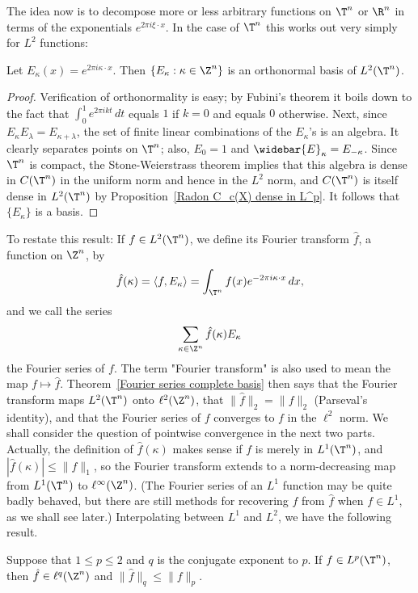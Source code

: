 The idea now is to decompose more or less arbitrary functions on $\T^n$ or $\R^n$ in terms of the exponentials $e^{2\pi i\xi\cdot x}$. In the case of $\T^n$ this works out very simply for $L^2$ functions:
\begin{theorem}\label{Fourier series complete basis}
Let $E_\kappa(x)=e^{2\pi i\kappa\cdot x}$. Then $\{E_\kappa:\kappa\in\Z^n\}$ is an orthonormal basis of $L^2(\T^n)$.
\end{theorem}
\begin{proof}
Verification of orthonormality is easy; by Fubini's theorem it boils down to the fact that $\int_{0}^{1}e^{2\pi ikt}\,dt$ equals $1$ if $k=0$ and equals $0$ otherwise. Next, since $E_{\kappa}E_{\lambda}=E_{\kappa+\lambda}$, the set of finite linear combinations of the $E_{\kappa}$'s is an algebra. It clearly separates points on $\T^n$; also, $E_0=1$ and $\widebar{E}_{\kappa}=E_{-\kappa}$. Since $\T^n$ is compact, the Stone-Weierstrass theorem implies that this algebra is dense in $C(\T^n)$ in the uniform norm and hence in the $L^2$ norm, and $C(\T^n)$ is itself dense in $L^2(\T^n)$ by Proposition~\ref{Radon C_c(X) dense in L^p}. It follows that $\{E_\kappa\}$ is a basis.
\end{proof}
To restate this result: If $f\in L^2(\T^n)$, we define its Fourier transform $\hat{f}$, a function on $\Z^n$, by
\[\hat{f}(\kappa)=\langle f,E_\kappa\rangle=\int_{\T^n}f(x)e^{-2\pi i\kappa\cdot x}\,dx,\]
and we call the series
\[\sum_{\kappa\in\Z^n}\hat{f}(\kappa)E_\kappa\]
the Fourier series of $f$. The term "Fourier transform" is also used to mean the map $f\mapsto\hat{f}$. Theorem~\ref{Fourier series complete basis} then says that the Fourier transform maps $L^2(\T^n)$ onto $\ell^2(\Z^n)$, that $\|\hat{f}\|_2=\|f\|_2$ (Parseval's identity), and that the Fourier series of $f$ converges to $f$ in the $\ell^2$ norm. We shall consider the question of pointwise convergence in the next two parts.
Actually, the definition of $\hat{f}(\kappa)$ makes sense if $f$ is merely in $L^1(\T^n)$, and $|\hat{f}(\kappa)|\leq\|f\|_1$, so the Fourier transform extends to a norm-decreasing map from $L^1(\T^n)$ to $\ell^\infty(\Z^n)$. (The Fourier series of an $L^1$ function may be quite badly behaved, but there are still methods for recovering $f$ from $\hat{f}$ when $f\in L^1$, as we shall see later.) Interpolating between $L^1$ and $L^2$, we have the following result.
\begin{proposition}
Suppose that $1\leq p\leq 2$ and $q$ is the conjugate exponent to $p$. If $f\in L^p(\T^n)$, then $\hat{f}\in\ell^q(\Z^n)$ and $\|\hat{f}\|_q\leq\|f\|_p$.
\end{proposition}
